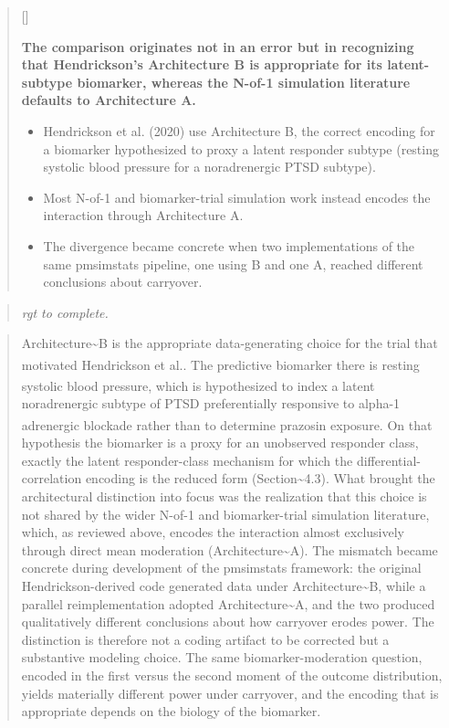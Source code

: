 \documentclass[
  11pt,
]{article}
\newcounter{pgraph}
\newenvironment{bullets}{%
  \stepcounter{pgraph}%
  \begin{quote}\small\sffamily\color[gray]{0.30}%
  {\normalfont\scriptsize\color[gray]{0.58}[\thepgraph]\enspace}}{%
  \end{quote}}
\newenvironment{rgt}{%
  \begin{quote}\small\itshape\color[RGB]{20,60,160}}{%
  \end{quote}}
\newenvironment{orig}{%
  \begin{quote}\normalsize\color[gray]{0.55}}{%
  \end{quote}}
\begin{document}
\begin{bullets}

\textbf{The comparison originates not in an error but in
recognizing that Hendrickson's Architecture B is appropriate for
its latent-subtype biomarker, whereas the N-of-1 simulation
literature defaults to Architecture A.}

\begin{itemize}\setlength{\itemsep}{2pt}\setlength{\parskip}{0pt}
\item Hendrickson et al. (2020) use Architecture B, the correct
  encoding for a biomarker hypothesized to proxy a latent responder
  subtype (resting systolic blood pressure for a noradrenergic PTSD
  subtype).
\item Most N-of-1 and biomarker-trial simulation work instead
  encodes the interaction through Architecture A.
\item The divergence became concrete when two implementations of
  the same pmsimstats pipeline, one using B and one A, reached
  different conclusions about carryover.
\end{itemize}

\end{bullets}

\begin{rgt}
rgt to complete.

\end{rgt}

\begin{orig}
Architecture\textasciitilde B is the appropriate data-generating choice
for the trial that motivated Hendrickson et
al.\textsuperscript{}. The predictive
biomarker there is resting systolic blood
pressure\textsuperscript{}, which is
hypothesized to index a latent noradrenergic subtype of PTSD
preferentially responsive to alpha-1 adrenergic
blockade\textsuperscript{} rather than to
determine prazosin exposure. On that hypothesis the biomarker is a proxy
for an unobserved responder class, exactly the latent responder-class
mechanism for which the differential-correlation encoding is the reduced
form (Section\textasciitilde4.3). What brought the architectural
distinction into focus was the realization that this choice is not
shared by the wider N-of-1 and biomarker-trial simulation literature,
which, as reviewed above, encodes the interaction almost exclusively
through direct mean moderation (Architecture\textasciitilde A). The
mismatch became concrete during development of the pmsimstats framework:
the original Hendrickson-derived code generated data under
Architecture\textasciitilde B, while a parallel reimplementation adopted
Architecture\textasciitilde A, and the two produced qualitatively
different conclusions about how carryover erodes power. The distinction
is therefore not a coding artifact to be corrected but a substantive
modeling choice. The same biomarker-moderation question, encoded in the
first versus the second moment of the outcome distribution, yields
materially different power under carryover, and the encoding that is
appropriate depends on the biology of the biomarker.

\end{orig}
\end{document}
